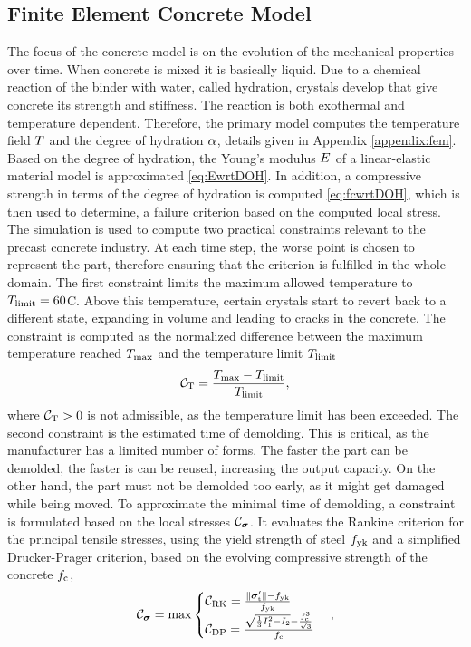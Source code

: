 \subsection{Finite Element Concrete Model}
The focus of the concrete model is on the evolution of the mechanical properties over time.
When concrete is mixed it is basically liquid.
Due to a  chemical reaction of the binder with water, called hydration, crystals develop that give concrete its strength and stiffness.
The reaction is both exothermal and temperature dependent.
Therefore, the primary model computes the temperature field $T$ and the degree of hydration $\alpha$, details given in Appendix \ref{appendix:fem}.
Based on the degree of hydration, the Young's modulus $E$ of a linear-elastic material model
is approximated \eqref{eq:EwrtDOH}.
In addition, a compressive strength in terms of the degree of hydration is computed \eqref{eq:fcwrtDOH}, which is then used to determine, a failure criterion based on the computed local stress.
The simulation is used to compute two practical constraints relevant to the precast concrete industry.
At each time step, the worse point is chosen to represent the part, therefore ensuring that the criterion is fulfilled in the whole domain.
The first constraint limits the maximum allowed temperature to $T_{\text{limit}} = 60$\textdegree C.
Above this temperature, certain crystals start to revert back to a different state, expanding in volume and leading to cracks in the concrete.
The constraint is computed as the normalized difference between the maximum temperature reached $T_{\text{max}}$ and the temperature limit $T_{\text{limit}}$ 
\begin{align}
\mathcal{C}_{\text{T}} = \frac{T_{\text{max}} - T_{\text{limit}}}{T_{\text{limit}}},
\end{align}
where $\mathcal{C}_{\text{T}} > 0$ is not admissible, as the temperature limit has been exceeded.
The second constraint is the estimated time of demolding.
This is critical, as the manufacturer has a limited number of forms.
The faster the part can be demolded, the faster is can be reused, increasing the output capacity.
On the other hand, the part must not be demolded too early, as it might get damaged while being moved.
To approximate the minimal time of demolding, a constraint is formulated based on the local stresses $\mathcal{C}_{\boldsymbol{\sigma}}$.
It evaluates the Rankine criterion for the principal tensile stresses, using the yield strength of steel $f_{\text{yk}}$ and a simplified Drucker-Prager criterion, based on the evolving compressive strength of the concrete $f_{\text{c}}$,
\begin{align}
	\mathcal{C}_{\boldsymbol{\sigma}} =  \max
	\begin{cases}
		\mathcal{C}_{\text{RK}} = \frac{\|\boldsymbol{\sigma}_{\text{t}}'\| - f_{\text{yk}}}{f_{\text{yk}}} \\
		\mathcal{C}_{\text{DP}} =  \frac{\sqrt{\frac{1}{3} I_{1}^2 - I_{2}} - \frac{f_{\text{c}}^3}{\sqrt{3}}}{f_{\text{c}}}
	\end{cases},
\end{align}
